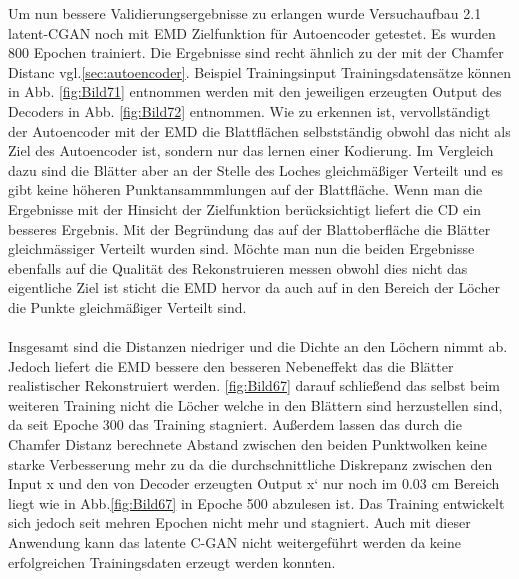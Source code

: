 \documentclass{llncs}
\begin{document}
Um nun bessere Validierungsergebnisse zu erlangen wurde Versuchaufbau 2.1 latent-CGAN noch mit EMD Zielfunktion für Autoencoder getestet. Es wurden 800 Epochen trainiert. Die Ergebnisse sind recht ähnlich zu der mit der Chamfer Distanc vgl.\ref{sec:autoencoder}. Beispiel Trainingsinput Trainingsdatensätze können in Abb. \ref{fig:Bild71} entnommen werden mit den jeweiligen erzeugten Output des Decoders in Abb. \ref{fig:Bild72} entnommen. Wie zu erkennen ist, vervollständigt der Autoencoder mit der EMD die Blattflächen selbstständig obwohl das nicht als Ziel des Autoencoder ist, sondern nur das lernen einer Kodierung. Im Vergleich dazu sind die Blätter aber an der Stelle des Loches gleichmäßiger Verteilt und es gibt keine höheren Punktansammmlungen auf der Blattfläche. Wenn man die Ergebnisse mit der Hinsicht der Zielfunktion berücksichtigt liefert die CD ein besseres Ergebnis. Mit der Begründung das auf der Blattoberfläche die Blätter gleichmässiger Verteilt wurden sind. Möchte man nun die beiden Ergebnisse ebenfalls auf die Qualität des Rekonstruieren messen obwohl dies nicht das eigentliche Ziel ist sticht die EMD hervor da auch auf in den Bereich der Löcher die Punkte gleichmäßiger Verteilt sind.
\\\\
Insgesamt sind die Distanzen niedriger und die Dichte an den Löchern nimmt ab. Jedoch liefert die EMD bessere den besseren Nebeneffekt das die Blätter realistischer Rekonstruiert werden. \ref{fig:Bild67} darauf schließend das selbst beim weiteren Training nicht die Löcher welche in den Blättern sind herzustellen sind, da seit Epoche 300 das Training stagniert. Außerdem lassen das durch die Chamfer Distanz berechnete Abstand zwischen den beiden Punktwolken keine starke Verbesserung mehr zu da die durchschnittliche Diskrepanz zwischen den Input x und den von Decoder erzeugten Output x` nur noch im 0.03 cm Bereich liegt wie in Abb.\ref{fig:Bild67} in Epoche 500 abzulesen ist. Das Training entwickelt sich jedoch seit mehren Epochen nicht mehr und stagniert. Auch mit dieser Anwendung kann das latente C-GAN nicht weitergeführt werden da keine erfolgreichen Trainingsdaten erzeugt werden konnten.
\end{document}
